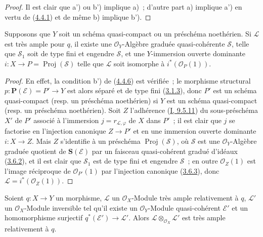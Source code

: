 \begin{proof}
Il est clair que a') ou b') implique a)~; d'autre part a) implique a') en
vertu de (\hyperref[II.4.4.1-fr]{4.4.1}) et de même b) implique b').
\end{proof}

\begin{corollary}[4.4.7]
\label{II.4.4.7-fr}
Supposons que $Y$ soit un schéma quasi-compact ou un préschéma noethérien. Si
$\mathcal{L}$ est très ample pour $q$, il existe une $\mathcal{O}_Y$-Algèbre
graduée quasi-cohérente $\mathcal{S}$, telle que $\mathcal{S}_1$ soit de type
fini et engendre $\mathcal{S}$, et une $Y$-immersion ouverte dominante
$i:X\to P=\operatorname{Proj}(\mathcal{S})$ telle que $\mathcal{L}$ soit
isomorphe à $i^*(\mathcal{O}_P(1))$.
\end{corollary}

\begin{proof}
En effet, la condition b') de (\hyperref[II.4.4.6-fr]{4.4.6}) est vérifiée~;
le morphisme structural $p:\mathbf{P}(\mathcal{E})=P'\to Y$ est alors séparé
et de type fini (\hyperref[II.3.1.3-fr]{3.1.3}), donc $P'$ est un schéma
quasi-compact (resp. un préschéma noethérien) si $Y$ est un schéma
quasi-compact (resp. un préschéma noethérien). Soit $Z$ l'adhérence
(\hyperref[I.9.5.11-fr]{I, 9.5.11}) du sous-préschéma $X'$ de $P'$ associé à
l'immersion $j=r_{\mathcal{L},\varphi}$ de $X$ dans $P'$~; il est clair que
$j$ se factorise en l'injection canonique $Z\to P'$ et en une immersion
ouverte dominante $i:X\to Z$. Mais $Z$ s'identifie à un préschéma
$\operatorname{Proj}(\mathcal{S})$, où $\mathcal{S}$ est une
$\mathcal{O}_Y$-Algèbre graduée quotient de $\mathbf{S}(\mathcal{E})$ par un
faisceau quasi-cohérent gradué d'idéaux
(\hyperref[II.3.6.2-fr]{3.6.2}), et il est clair que $\mathcal{S}_1$ est de
type fini et engendre $\mathcal{S}$~; en outre $\mathcal{O}_Z(1)$ est l'image
réciproque de $\mathcal{O}_{P'}(1)$ par l'injection canonique
(\hyperref[II.3.6.3-fr]{3.6.3}), donc
$\mathcal{L}=i^*(\mathcal{O}_Z(1))$.
\end{proof}

\begin{proposition}[4.4.8]
\label{II.4.4.8-fr}
Soient $q:X\to Y$ un morphisme, $\mathcal{L}$ un $\mathcal{O}_X$-Module très
ample relativement à $q$, $\mathcal{L}'$ un $\mathcal{O}_X$-Module inversible
tel qu'il existe un $\mathcal{O}_Y$-Module quasi-cohérent $\mathcal{E}'$ et un
homomorphisme surjectif $q^*(\mathcal{E}')\to\mathcal{L}'$. Alors
$\mathcal{L}\otimes_{\mathcal{O}_X}\mathcal{L}'$ est très ample relativement
à $q$.
\end{proposition}

